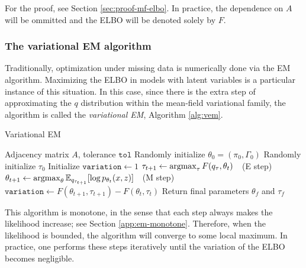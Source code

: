\documentclass[../../main.tex]{subfiles} %
\begin{document}
For the proof, see Section \ref{sec:proof-mf-elbo}. In practice, the 
dependence on \(A\) will be ommitted and the ELBO will be denoted 
solely by \(F\).

\subsubsection{The variational EM algorithm}
Traditionally, optimization under missing data is numerically done via the EM 
algorithm. Maximizing the ELBO in models with latent variables is a particular 
instance of this situation. In this case, since there is the extra step of 
approximating the \(q\) distribution within the mean-field variational family, 
the algorithm is called the \textit{variational EM}, Algorithm \ref{alg:vem}.

\begin{algorithm}
	\caption{Variational EM}
	\label{alg:vem}
	\begin{algorithmic}
		\Require Adjacency matrix \(A\), 
		tolerance \(\texttt{tol}\)
		\State Randomly initialize 
		\(\theta_0 = (\pi_0, 
		\Gamma_0)\)
		\State Randomly initialize \(\tau_0\)
		\State Initialize \(\texttt{variation} \gets 1\)
		\State \(\tau_{t+1} \gets 
		\operatorname*{argmax}_\tau F(q_\tau, \theta_{t}) \quad\)(E step)
		\State \( \theta_{t+1} \gets 
	    \operatorname*{argmax}_\theta \mathbb 
		E_{q_{\tau_{t+1}}} [\log 
		p_{\theta_{t}} 
		(x, z)] \quad\)(M step)
		\State \(\texttt{variation} \gets 
		F(\theta_{t+1}, \tau_{t+1}) - 
		F(\theta_{t}, \tau_{t})\)
		\EndWhile
		\State Return final parameters \(\theta_f\) and \(\tau_f\)
	\end{algorithmic}
\end{algorithm}


This algorithm is monotone, in the sense that each step always 
makes the 
likelihood increase; see Section \ref{app:em-monotone}. Therefore, 
when the 
likelihood is bounded, the algorithm will converge to some local 
maximum. In 
practice, one performs these steps iteratively until the variation of the ELBO 
becomes negligible.
\end{document}
